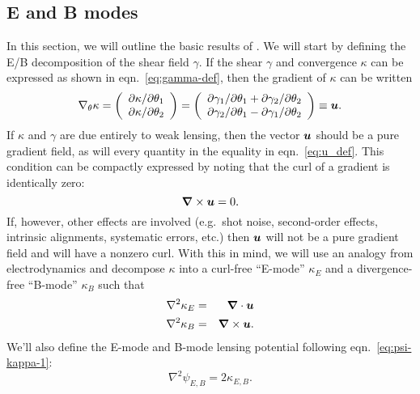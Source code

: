 \subsection{E and B modes}
\label{sec:EBmode}
In this section, we will outline the basic results of \citet{Schneider02b}.
We will start by defining the E/B decomposition of the shear field $\gamma$.
If the shear $\gamma$ and convergence $\kappa$ can be expressed as shown
in eqn.~\ref{eq:gamma-def}, then the gradient of $\kappa$ can be written
\begin{equation}
  \label{eq:u_def}
  \nabla_\theta \kappa =
  \left(
  \begin{array}{l}
    \partial \kappa / \partial\theta_1\\
    \partial \kappa / \partial\theta_2 
  \end{array}
  \right) 
  =
  \left(
  \begin{array}{l}
    \partial \gamma_1 / \partial\theta_1 + \partial\gamma_2/\partial\theta_2\\
    \partial \gamma_2 / \partial\theta_1 - \partial\gamma_1/\partial\theta_2
  \end{array}
  \right)
  \equiv
  \boldsymbol{u}.
\end{equation}
If $\kappa$ and $\gamma$ are due entirely to weak lensing, then the vector
$\boldsymbol{u}$ should be a pure gradient field, as will every
quantity in the equality in eqn.~\ref{eq:u_def}.  This condition can be
compactly expressed by noting that the curl of a gradient is identically
zero:
\begin{equation}
  \label{eq:curl-free}
  \boldsymbol{\nabla} \times \boldsymbol{u} = 0.
\end{equation}
If, however, other effects are involved (e.g.~shot noise, second-order effects,
intrinsic alignments, systematic errors, etc.)
then $\boldsymbol{u}$ will not be a pure gradient field and will have
a nonzero curl.
With this in mind, we will use an analogy from electrodynamics and decompose
$\kappa$ into a curl-free ``E-mode'' $\kappa_E$ and a divergence-free
``B-mode'' $\kappa_B$ such that
\begin{eqnarray}
  \nabla^2 \kappa_E &=& \boldsymbol{\nabla} \cdot \boldsymbol{u}\\
  \nabla^2 \kappa_B &=& \boldsymbol{\nabla} \times \boldsymbol{u}.
\end{eqnarray}
We'll also define the E-mode and B-mode lensing potential following
eqn.~\ref{eq:psi-kappa-1}:
\begin{equation}
  \nabla^2 \psi_{E, B} = 2\kappa_{E, B}.
\end{equation}
